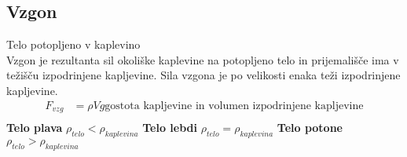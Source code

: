 {\color{indiagreen}\subsection{Vzgon}}
Telo potopljeno v kaplevino\\
Vzgon je rezultanta sil okoliške kaplevine na potopljeno telo in prijemališče ima v težišču izpodrinjene kapljevine. Sila vzgona je po velikosti enaka teži izpodrinjene kapljevine. \\
\begin{align*}
	F_{vzg} &= \rho Vg \text{gostota kapljevine in volumen izpodrinjene kapljevine}\\
\end{align*}
\textbf{Telo plava}
$\rho_{telo} < \rho_{kaplevina}$
\textbf{Telo lebdi}
$\rho_{telo} = \rho_{kaplevina}$
\textbf{Telo potone}
$\rho_{telo} > \rho_{kaplevina}$